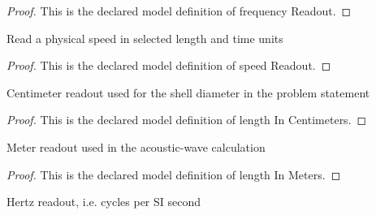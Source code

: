 \begin{proof}
  This is the declared model definition of frequency Readout.
\end{proof}
\begin{definition}
  \label{def:physics:phyx-mini-0217:phyxminiproblems-problemphyxmini0217-speedreadout}
  Read a physical speed in selected length and time units
\end{definition}
\begin{proof}
  This is the declared model definition of speed Readout.
\end{proof}
\begin{definition}
  \label{def:physics:phyx-mini-0217:phyxminiproblems-problemphyxmini0217-lengthincentimeters}
  Centimeter readout used for the shell diameter in the problem statement
\end{definition}
\begin{proof}
  This is the declared model definition of length In Centimeters.
\end{proof}
\begin{definition}
  \label{def:physics:phyx-mini-0217:phyxminiproblems-problemphyxmini0217-lengthinmeters}
  Meter readout used in the acoustic-wave calculation
\end{definition}
\begin{proof}
  This is the declared model definition of length In Meters.
\end{proof}
\begin{definition}
  \label{def:physics:phyx-mini-0217:phyxminiproblems-problemphyxmini0217-frequencyinhertz}
  Hertz readout, i.e. cycles per SI second
\end{definition}
